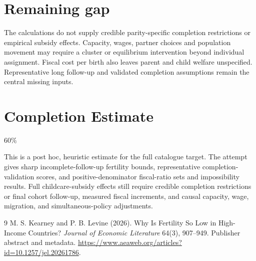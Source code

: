 \documentclass[11pt]{article}
\theoremstyle{remark}
\begin{document}
\section*{Remaining gap}
The calculations do not supply credible parity-specific completion restrictions or empirical subsidy effects. Capacity, wages, partner choices and population movement may require a cluster or equilibrium intervention beyond individual assignment. Fiscal cost per birth also leaves parent and child welfare unspecified. Representative long follow-up and validated completion assumptions remain the central missing inputs.

\section{Completion Estimate}
60\%

This is a post hoc, heuristic estimate for the full catalogue target.
The attempt gives sharp incomplete-follow-up fertility bounds, representative completion-validation scores, and positive-denominator fiscal-ratio sets and impossibility results. Full childcare-subsidy effects still require credible completion restrictions or final cohort follow-up, measured fiscal increments, and causal capacity, wage, migration, and simultaneous-policy adjustments.

\begin{thebibliography}{9}
 M. S. Kearney and P. B. Levine (2026). Why Is Fertility So Low in High-Income Countries? \emph{Journal of Economic Literature} 64(3), 907--949. Publisher abstract and metadata. \url{https://www.aeaweb.org/articles?id=10.1257/jel.20261786}.
\end{thebibliography}
\end{document}
